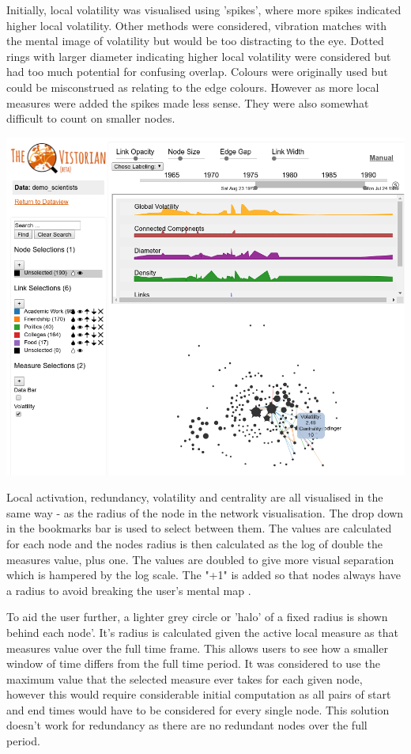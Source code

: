 Initially, local volatility was visualised using 'spikes', where more spikes indicated higher local volatility. Other methods were considered, vibration matches with the mental image of volatility but would be too distracting to the eye. Dotted rings with larger diameter indicating higher local volatility were considered but had too much potential for confusing overlap. Colours were originally used but could be misconstrued as relating to the edge colours. 
However as more local measures were added the spikes made less sense. They were also somewhat difficult to count on smaller nodes.

\begin{center}
\includegraphics[trim={9cm, 0, 0, 14cm}, clip, width=140mm]{./Figures/finalUI.png}
\end{center}

Local activation, redundancy, volatility and centrality are all visualised in the same way - as the radius of the node in the network visualisation. The drop down in the bookmarks bar is used to select between them. The values are calculated for each node and the nodes radius is then calculated as the log of double the measures value, plus one. The values are doubled to give more visual separation which is hampered by the log scale. The "+1" is added so that nodes always have a radius to avoid breaking the user's mental map \cite{BLANK}.

To aid the user further, a lighter grey circle or 'halo' of a fixed radius is shown behind each node'. It's radius is calculated given the active local measure as that measures value over the full time frame. This allows users to see how a smaller window of time differs from the full time period. It was considered to use the maximum value that the selected measure ever takes for each given node, however this would require considerable initial computation as all pairs of start and end times would have to be considered for every single node. This solution doesn't work for redundancy as there are no redundant nodes over the full period.

